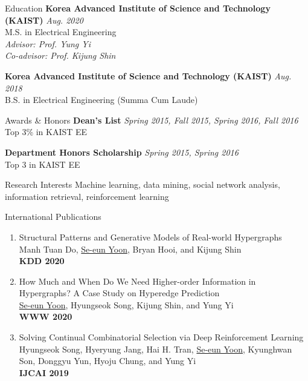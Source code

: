 \documentclass{resume} %
\begin{document}

\begin{rSection}{Education}
{\bf Korea Advanced Institute of Science and Technology (KAIST)} \hfill \textit{Aug. 2020} 
\\M.S. in Electrical Engineering
\\\textit{Advisor: Prof. Yung Yi}
\\\textit{Co-advisor: Prof. Kijung Shin}

{\bf Korea Advanced Institute of Science and Technology (KAIST)} \hfill \textit{Aug. 2018} 
\\B.S. in Electrical Engineering (Summa Cum Laude)

\end{rSection}

\begin{rSection}{Awards \& Honors}
\textbf{Dean's List} \hfill \textit{ Spring 2015, Fall 2015, Spring 2016, Fall 2016} 
\\Top 3\% in KAIST EE

{\bf Department Honors Scholarship} \hfill {\em Spring 2015, Spring 2016} 
\\Top 3 in KAIST EE
\end{rSection}


\begin{rSection}{Research Interests}
Machine learning, data mining, social network analysis, information retrieval, reinforcement learning

\end{rSection}


\begin{rSection}{International Publications}
	\begin{enumerate}
		
	\item Structural Patterns and Generative Models of Real-world Hypergraphs \\
	Manh Tuan Do, \underline{Se-eun Yoon}, Bryan Hooi, and Kijung Shin\\
	\textbf{KDD 2020} 
		
		
	\item How Much and When Do We Need Higher-order Information in Hypergraphs? A Case Study on Hyperedge Prediction \\
	\underline{Se-eun Yoon}, Hyungseok Song, Kijung Shin, and Yung Yi\\
	\textbf{WWW 2020}
	
	\item Solving Continual Combinatorial Selection via Deep Reinforcement Learning\\
	Hyungseok Song, Hyeryung Jang, Hai H. Tran, \underline{Se-eun Yoon}, Kyunghwan Son, Donggyu Yun, Hyoju Chung, and Yung Yi\\
	\textbf{IJCAI 2019}
	\end{enumerate}
\end{rSection}
\end{document}

